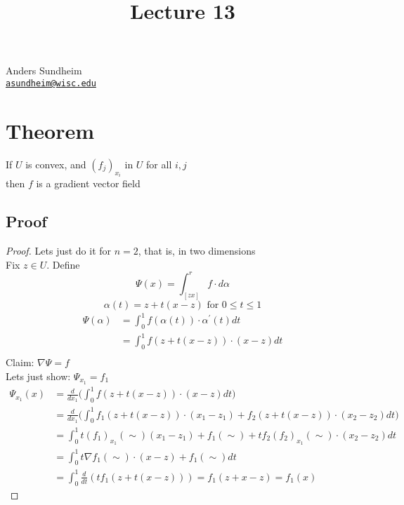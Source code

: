 \documentclass[12pt]{article}
\title{Lecture 13}
\newcommand{\prm}{^\prime}
\begin{document}
\maketitle
\vspace*{-0.25in}
\begin{center}
	Anders Sundheim \\
	\href{mailto:asundheim@wisc.edu}{{\tt asundheim@wisc.edu}}
\end{center}
\section*{Theorem}
If $U$ is convex, and $(f_j)_{x_i}$ in $U$ for all $i,j$ \\
then $f$ is a gradient vector field
\subsection*{Proof}
\begin{proof}
  Lets just do it for $n=2$, that is, in two dimensions \\
  Fix $z\in U$. Define \\
  \[ \Psi(x)=\int_{[zx]}^rf\cdot d\alpha \]
  \[ \alpha(t)=z+t(x-z)\text{ for } 0\leq t \leq 1 \]
  \begin{align*}
    \Psi(\alpha) & =\int_0^1f(\alpha(t))\cdot \alpha\prm(t)dt \\
    & = \int_0^1f(z+t(x-z))\cdot(x-z)dt \\
  \end{align*}
  Claim: $\nabla\Psi=f$ \\
  Lets just show: $\Psi_{x_1}=f_1$ \\
  \begin{align*}
    \Psi_{x_1}(x) & =\frac{d}{dx_1}\Big(\int_0^1f(z+t(x-z))\cdot(x-z)dt\Big) \\
    & = \frac{d}{dx_1}\Big(\int_0^1f_1(z+t(x-z))\cdot(x_1-z_1)+f_2(z+t(x-z))\cdot(x_2-z_2)dt\Big) \\
    & = \int_0^1t(f_1)_{x_1}(\sim)(x_1-z_1)+f_1(\sim)+tf_2(f_2)_{x_1}(\sim)\cdot(x_2-z_2)dt \\
    & = \int_0^1t\nabla f_1(\sim)\cdot(x-z)+f_1(\sim)dt \\
    & = \int_0^1\frac{d}{dt}(tf_1(z+t(x-z)))=f_1(z+x-z)=f_1(x)
  \end{align*}
\end{proof}
\end{document}

